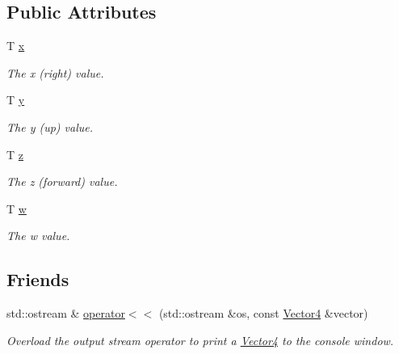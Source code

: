 \subsection*{Public Attributes}
\begin{DoxyCompactItemize}
\item 
T \hyperlink{classsparky_1_1_vector4_a546b527c02c4587af8b885a5004ff7c6}{x}\hypertarget{classsparky_1_1_vector4_a546b527c02c4587af8b885a5004ff7c6}{}\label{classsparky_1_1_vector4_a546b527c02c4587af8b885a5004ff7c6}

\begin{DoxyCompactList}\small\item\em The x (right) value. \end{DoxyCompactList}\item 
T \hyperlink{classsparky_1_1_vector4_a0119337e03238bcc42ac68d757c0e646}{y}\hypertarget{classsparky_1_1_vector4_a0119337e03238bcc42ac68d757c0e646}{}\label{classsparky_1_1_vector4_a0119337e03238bcc42ac68d757c0e646}

\begin{DoxyCompactList}\small\item\em The y (up) value. \end{DoxyCompactList}\item 
T \hyperlink{classsparky_1_1_vector4_a7953fe8d9716f2182b870df0ab84b2df}{z}\hypertarget{classsparky_1_1_vector4_a7953fe8d9716f2182b870df0ab84b2df}{}\label{classsparky_1_1_vector4_a7953fe8d9716f2182b870df0ab84b2df}

\begin{DoxyCompactList}\small\item\em The z (forward) value. \end{DoxyCompactList}\item 
T \hyperlink{classsparky_1_1_vector4_a9ef40fefa838a0ff94ff87eb74fe5d02}{w}\hypertarget{classsparky_1_1_vector4_a9ef40fefa838a0ff94ff87eb74fe5d02}{}\label{classsparky_1_1_vector4_a9ef40fefa838a0ff94ff87eb74fe5d02}

\begin{DoxyCompactList}\small\item\em The w value. \end{DoxyCompactList}\end{DoxyCompactItemize}
\subsection*{Friends}
\begin{DoxyCompactItemize}
\item 
std\+::ostream \& \hyperlink{classsparky_1_1_vector4_a9acef5efd2eb365a9b51c1ff963f0bb4}{operator$<$$<$} (std\+::ostream \&os, const \hyperlink{classsparky_1_1_vector4}{Vector4} \&vector)
\begin{DoxyCompactList}\small\item\em Overload the output stream operator to print a \hyperlink{classsparky_1_1_vector4}{Vector4} to the console window. \end{DoxyCompactList}\end{DoxyCompactItemize}


